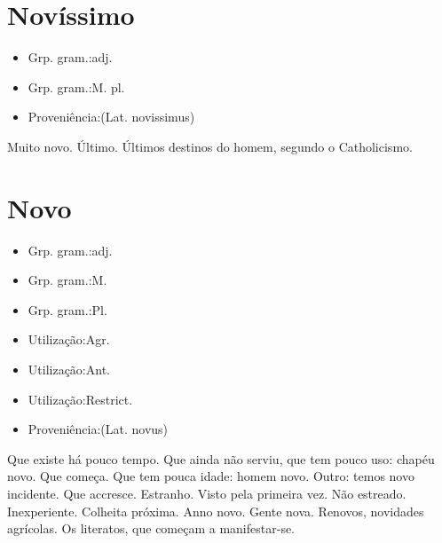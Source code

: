 \section{Novíssimo}
\begin{itemize}
\item {Grp. gram.:adj.}
\end{itemize}
\begin{itemize}
\item {Grp. gram.:M. pl.}
\end{itemize}
\begin{itemize}
\item {Proveniência:(Lat. \textunderscore novissimus\textunderscore )}
\end{itemize}
Muito novo.
Último.
Últimos destinos do homem, segundo o Catholicismo.
\section{Novo}
\begin{itemize}
\item {Grp. gram.:adj.}
\end{itemize}
\begin{itemize}
\item {Grp. gram.:M.}
\end{itemize}
\begin{itemize}
\item {Grp. gram.:Pl.}
\end{itemize}
\begin{itemize}
\item {Utilização:Agr.}
\end{itemize}
\begin{itemize}
\item {Utilização:Ant.}
\end{itemize}
\begin{itemize}
\item {Utilização:Restrict.}
\end{itemize}
\begin{itemize}
\item {Proveniência:(Lat. \textunderscore novus\textunderscore )}
\end{itemize}
Que existe há pouco tempo.
Que ainda não serviu, que tem pouco uso: \textunderscore chapéu novo\textunderscore .
Que começa.
Que tem pouca idade: \textunderscore homem novo\textunderscore .
Outro: \textunderscore temos novo incidente\textunderscore .
Que accresce.
Estranho.
Visto pela primeira vez.
Não estreado.
Inexperiente.
Colheita próxima.
Anno novo.
Gente nova.
Renovos, novidades agrícolas.
Os literatos, que começam a manifestar-se.
